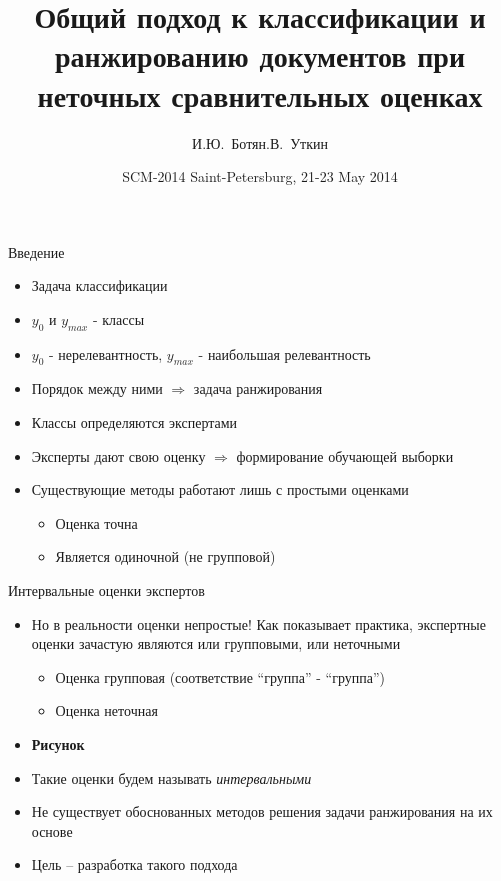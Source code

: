 \documentclass[11pt]{beamer}
\title[]{Общий подход к классификации и ранжированию документов при неточных сравнительных оценках}
\author[И.Ю.~Ботян, Л.В.~Уткин]{И.Ю.~Ботян\andЛ.В.~Уткин}
\institute[СПбГЛТУ]{\large Санкт-Петербургский государственный лесотехнический университет}
\date[SCM 2014]{\large SCM-2014 Saint-Petersburg, 21-23 May 2014}
\begin{document}
\begin{frame}

\titlepage

\end{frame}
\begin{frame}{Введение}

\begin{itemize}
	\item Задача классификации
	\item \(y_0\) и \(y_{max}\) - классы
	\item \(y_0\) - нерелевантность, \(y_{max}\) - наибольшая релевантность
	\item Порядок между ними \(\Rightarrow\) задача ранжирования
	\item Классы определяются экспертами
	\item Эксперты дают свою оценку \(\Rightarrow\) формирование обучающей выборки
	\item Существующие методы работают лишь с простыми оценками
	\begin{itemize}
		\item Оценка точна
		\item Является одиночной (не групповой)
	\end{itemize}
\end{itemize}

\end{frame}
\begin{frame}{Интервальные оценки экспертов}

\begin{itemize}
	\item Но в реальности оценки непростые! Как показывает практика, экспертные оценки зачастую являются или групповыми, или неточными
	\begin{itemize}
		\item Оценка групповая (соответствие ``группа'' - ``группа'')
		\item Оценка неточная
	\end{itemize}
	\item \textbf{Рисунок}
	\item Такие оценки будем называть \emph{интервальными}
	\item Не существует обоснованных методов решения задачи ранжирования на их основе
	\item Цель – разработка такого подхода
\end{itemize}

\end{frame}
\end{document}
